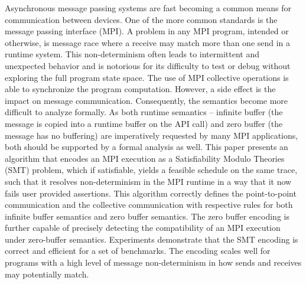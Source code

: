 Asynchronous message passing systems are fast becoming a common means for communication between devices.
%
One of the more common standards is the message passing interface (MPI).
%
A problem in any MPI program, intended or otherwise, is message race where a receive may match more than one send in a runtime system.
%
This non-determinism often leads to intermittent and unexpected behavior and is notorious for its difficulty to test or debug without exploring the full program state space. 
%
The use of MPI collective operations is able to synchronize the program computation. 
%
However, a side effect is the impact on message communication.
%
Consequently, the semantics become more difficult to analyze formally. 
%
As both runtime semantics -- infinite buffer (the message is copied into a runtime buffer on the API call) and zero buffer (the message has no buffering) are imperatively requested by many MPI applications, both should be supported by a formal analysis as well. 
%
This paper presents an algorithm that encodes an MPI execution as a Satisfiability Modulo Theories (SMT) problem, which if satisfiable, yields a feasible schedule on the same trace, such that it resolves non-determinism in the MPI runtime in a way that it now fails user provided assertions.
%
This algorithm correctly defines the point-to-point communication and the collective communication with respective rules for both infinite buffer semantics and zero buffer semantics. 
%
The zero buffer encoding is further capable of precisely detecting the compatibility of an MPI execution under zero-buffer semantics.
%
Experiments demonstrate that the SMT encoding is correct and efficient for a set of benchmarks. 
%
The encoding scales well for programs with a high level of message non-determinism in how sends and receives may potentially match.